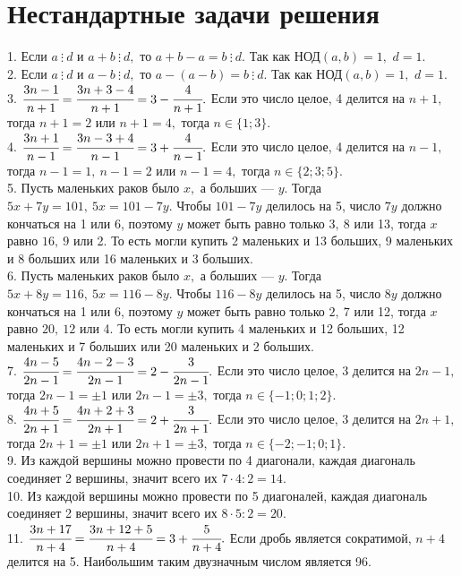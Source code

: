 \documentclass[12pt]{article}
\begin{document}
\section{Нестандартные задачи решения}
1. Если $a\ \vdots\ d$ и $a+b\ \vdots\ d,$ то $a+b-a=b\ \vdots\ d.$ Так как НОД$(a, b)=1,$ $d=1.$\\
2. Если $a\ \vdots\ d$ и $a-b\ \vdots\ d,$ то $a-(a-b)=b\ \vdots\ d.$ Так как НОД$(a, b)=1,$ $d=1.$\\
3. $\cfrac{3n-1}{n+1}=\cfrac{3n+3-4}{n+1}=3-\cfrac{4}{n+1}.$ Если это число целое, 4 делится на $n+1,$ тогда $n+1=2$ или $n+1=4,$
тогда $n\in\{1; 3\}.$\\
4. $\cfrac{3n+1}{n-1}=\cfrac{3n-3+4}{n-1}=3+\cfrac{4}{n-1}.$ Если это число целое, 4 делится на $n-1,$ тогда $n-1=1,\ n-1=2$ или $n-1=4,$
тогда $n\in\{2; 3; 5\}.$\\
5. Пусть маленьких раков было $x,$ а больших --- $y.$ Тогда  $5x+7y=101,\ 5x=101-7y.$ Чтобы $101-7y$ делилось на 5, число $7y$ должно кончаться на 1 или 6, поэтому $y$ может быть равно только $3,\ 8$ или 13, тогда $x$ равно $16,\ 9$ или 2. То есть могли купить 2 маленьких и 13 больших, 9 маленьких и 8 больших или 16 маленьких и 3 больших.\\
6. Пусть маленьких раков было $x,$ а больших --- $y.$ Тогда  $5x+8y=116,\ 5x=116-8y.$ Чтобы $116-8y$ делилось на 5, число $8y$ должно кончаться на 1 или 6, поэтому $y$ может быть равно только $2,\ 7$ или 12, тогда $x$ равно $20,\ 12$ или 4. То есть могли купить 4 маленьких и 12 больших, 12 маленьких и 7 больших или 20 маленьких и 2 больших.\\
7. $\cfrac{4n-5}{2n-1}=\cfrac{4n-2-3}{2n-1}=2-\cfrac{3}{2n-1}.$ Если это число целое, 3 делится на $2n-1,$ тогда $2n-1=\pm1$ или $2n-1=\pm3,$ тогда
$n\in\{-1; 0; 1; 2\}.$\\
8. $\cfrac{4n+5}{2n+1}=\cfrac{4n+2+3}{2n+1}=2+\cfrac{3}{2n+1}.$ Если это число целое, 3 делится на $2n+1,$ тогда $2n+1=\pm1$ или $2n+1=\pm3,$ тогда
$n\in\{-2; -1; 0; 1\}.$\\
9. Из каждой вершины можно провести по 4 диагонали, каждая диагональ соединяет 2 вершины, значит всего их $7\cdot4:2=14.$\\
10. Из каждой вершины можно провести по 5 диагоналей, каждая диагональ соединяет 2 вершины, значит всего их $8\cdot5:2=20.$\\
11. $\cfrac{3n+17}{n+4}=\cfrac{3n+12+5}{n+4}=3+\cfrac{5}{n+4}.$ Если дробь является сократимой, $n+4$ делится на 5. Наибольшим таким двузначным числом является 96.\\
\end{document}
